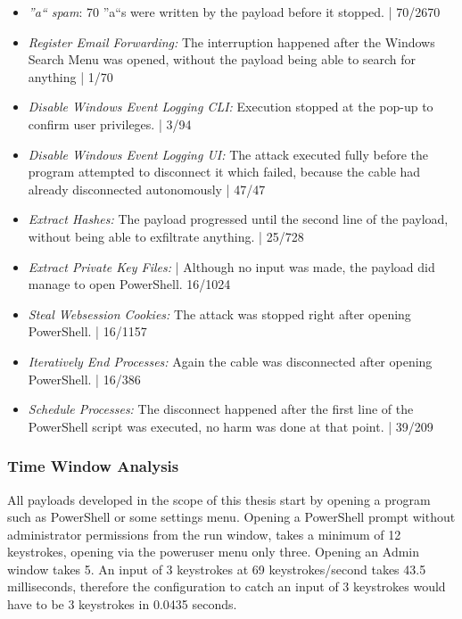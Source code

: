 \begin{itemize}
    \item  \emph{''a`` spam}: 70 ''a``s were written by the payload before it stopped. | 70/2670
    \item  \emph{Register Email Forwarding:} The interruption happened after the Windows Search Menu was opened, without the payload being able to search for anything  |  1/70 
    \item  \emph{Disable Windows Event Logging CLI:}  Execution stopped at the pop-up to confirm user privileges. | 3/94
    \item  \emph{Disable Windows Event Logging UI:} The attack executed fully before the program attempted to disconnect it which failed, because the cable had already disconnected autonomously | 47/47
    \item  \emph{Extract Hashes:}  The payload progressed until the second line of the payload, without being able to exfiltrate anything. | 25/728 
    \item  \emph{Extract Private Key Files:}  | Although no input was made, the payload did manage to open PowerShell. 16/1024
    \item  \emph{Steal Websession Cookies:} The attack was stopped right after opening PowerShell. | 16/1157
    \item  \emph{Iteratively End Processes:} Again the cable was disconnected after opening PowerShell. | 16/386
    \item  \emph{Schedule Processes:} The disconnect happened after the first line of the PowerShell script was executed, no harm was done at that point. | 39/209
\end{itemize}





















\subsubsection{Time Window Analysis}

All payloads developed in the scope of this thesis start by opening a program such as PowerShell or some settings menu. Opening a PowerShell prompt without administrator permissions from the run window, takes a minimum of 12 keystrokes, opening via the poweruser menu only three. Opening an Admin window takes 5. 
An input of 3 keystrokes at 69 keystrokes/second takes 43.5 milliseconds, therefore the configuration to catch an input of 3 keystrokes would have to be 3 keystrokes in 0.0435 seconds.

